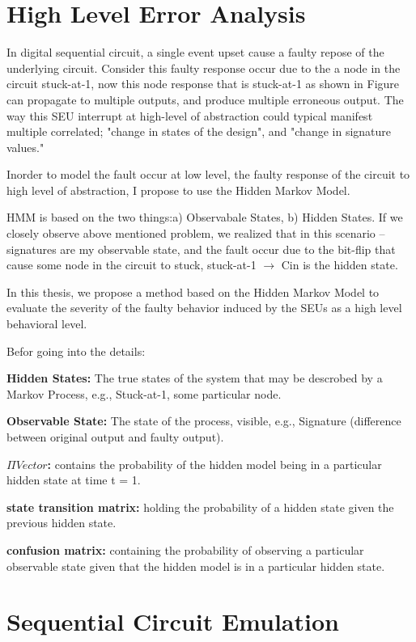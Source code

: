 \section{High Level Error Analysis}






In digital sequential circuit, a single event upset cause a  faulty repose of the underlying circuit. Consider this faulty response occur due to the a node in the circuit stuck-at-1, now this node response that is stuck-at-1 as shown in Figure~ can propagate to multiple outputs, and produce multiple erroneous output. The way this SEU interrupt at high-level of abstraction could typical manifest multiple correlated; "change in states of the design", and "change in signature values."

Inorder to model the fault occur at low level, the faulty response of the circuit to high level of abstraction, I propose to use the Hidden Markov Model.


HMM is based on  the two things:a) Observabale States, b) Hidden States. If we closely observe above mentioned problem, we realized that in this scenario --  signatures are my observable state, and the fault occur due to the bit-flip that cause some node in the circuit to stuck, stuck-at-1 $\rightarrow$ Cin is the hidden state.

In this thesis, we propose a method based on the Hidden Markov Model to evaluate the severity of the faulty behavior induced by the SEUs as a high level behavioral level. 


Befor going into the details:

\textbf{Hidden States:} The true states of the system that may be descrobed by a Markov Process, e.g., Stuck-at-1, some particular node.

\textbf{Observable State:} The state of the process, visible, e.g., Signature (difference between original output and faulty output).

\textbf{$\Pi Vector$:} contains the probability of the hidden model being in a particular hidden state at time t = 1.

\textbf{state transition matrix:}  holding the probability of a hidden state given the previous hidden state.

\textbf{confusion matrix:} containing the probability of observing a particular observable state given that the hidden model is in a particular hidden state. 


\section{Sequential Circuit Emulation}

